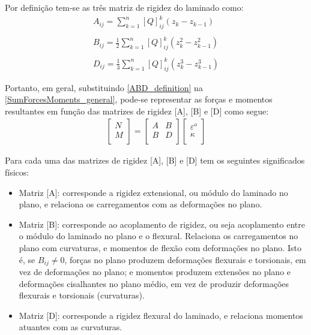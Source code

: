 Por definição tem-se as três matriz de rigidez do laminado como:
\begin{equation} \label{ABD_definition}
\begin{gathered}
A_{ij} = \sum^n_{k=1}[Q]^k_{ij}({z_k} -{z_{k-1}})\\~\\
B_{ij} =\frac{1}{2}\sum^n_{k=1}[Q]^k_{ij}({z^2_k} -{z^2_{k-1}})\\~\\
D_{ij} = \frac{1}{3}\sum^n_{k=1}[Q]^k_{ij}({z^3_k} -{z^3_{k-1}})
\end{gathered}
\end{equation}

Portanto, em geral, substituindo \autoref{ABD_definition} na \autoref{SumForcesMoments_general}, pode-se representar as forças e momentos resultantes em função das matrizes de rigidez [A], [B] e [D] como segue:
\begin{equation} \label{ABD_definition}
\begin{gathered}
\begin{bmatrix}
    N \\
    M \\
\end{bmatrix}
=
\begin{bmatrix}
		A & B \\
		B & D \\
\end{bmatrix}
\begin{bmatrix}
    \varepsilon^o \\
    \kappa \\
\end{bmatrix}
\end{gathered}
\end{equation}

Para cada uma das matrizes de rigidez [A], [B] e [D] tem os seguintes significados físicos:
\begin{itemize}
\item Matriz [A]: corresponde a rigidez extensional, ou módulo do laminado no plano, e relaciona os carregamentos com as deformações no plano.
\item Matriz [B]: corresponde ao acoplamento de rigidez, ou seja acoplamento entre o módulo do laminado no plano e o flexural. Relaciona os carregamentos no plano com curvaturas, e momentos de flexão com deformações no plano. Isto é, se $B_{ij}\neq 0$, forças no plano produzem deformações flexurais e torsionais, em vez de deformações no plano; e momentos produzem extensões no plano e deformações cisalhantes no plano médio, em vez de produzir deformações flexurais e torsionais (curvaturas).
\item Matriz [D]: corresponde a rigidez flexural do laminado, e relaciona momentos atuantes com as curvaturas.
\end{itemize}

